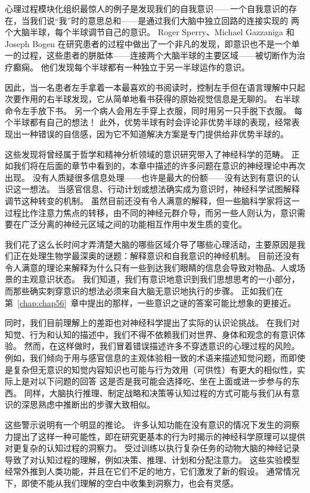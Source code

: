心理过程模块化组织最惊人的例子是发现我们的自我意识——一个自我意识的存在，当我们说“我”时的意思总和——是通过我们大脑中独立回路的连接实现的 两个大脑半球，每个半球调节自己的意识。
Roger Sperry、Michael Gazzaniga 和 Joseph Bogen 在研究患者的过程中做出了一个非凡的发现，即意识也不是一个单一的过程，这些患者的胼胝体——连接两个大脑半球的主要区域——被切断作为治疗癫痫。
他们发现每个半球都有一种独立于另一半球运作的意识。


因此，当一名患者左手拿着一本最喜欢的书阅读时，控制左手但在语言理解中只起次要作用的右半球发现，它从简单地看书获得的原始视觉信息是无聊的。
右半球命令左手放下书。
另一个病人会用左手穿上衣服，同时用另一只手脱下衣服。 每个半球都有自己的想法！
此外，优势半球有时会评论非优势半球的表现，经常表现出一种错误的自信感，因为它不知道解决方案是专门提供给非优势半球的。


这些发现将曾经属于哲学和精神分析领域的意识研究带入了神经科学的范畴。
正如我们将在后面的章节中看到的，本章中描述的许多问题在意识的神经理论中再次出现。
没有人质疑很多信息处理——也许是最大的份额——没有达到有意识的认识这一想法。
当感官信息、行动计划或想法确实成为意识时，神经科学试图解释调节这种转变的机制。
虽然目前还没有令人满意的解释，但一些脑科学家将这一过程比作注意力焦点的转移，由不同的神经元群介导，而另一些人则认为，意识需要在广泛分离的神经元区域之间的功能相互作用中发生质的变化。


我们花了这么长时间才弄清楚大脑的哪些区域介导了哪些心理活动，主要原因是我们正在处理生物学最深奥的谜题：解释意识和自我意识的神经机制。
目前还没有令人满意的理论来解释为什么只有一些到达我们眼睛的信息会导致对物品、人或场景的主观意识状态。 
我们知道，我们有意识地意识到我们思想思考的一小部分，而那些确实刺穿意识的想法必须来自大脑无意识地执行的步骤。
正如我们在第~\ref{chap:chap56}~章中提出的那样，一些意识之谜的答案可能比想象的更接近。


同时，我们目前理解上的差距也对神经科学提出了实际的认识论挑战。
在我们对知觉、行为和认知的描述中，我们不得不依赖我们对世界、身体和观念的有意识体验。
然而，在这样做时，我们冒着错误描述许多不穿透意识的心理过程的风险。
例如，我们倾向于用与感官信息的主观体验相一致的术语来描述知觉问题，而即使是复杂但无意识的知觉内容知识也可能与行为效用（可供性）有更大的相似性，实际上是对以下问题的回答 这是否是我可能会选择吃、坐在上面或进一步参与的东西。
同样，大脑执行推理、制定战略和决策等认知过程的方式可能与我们从有意识的深思熟虑中推断出的步骤大致相似。


这些警示说明有一个明显的推论。
许多认知功能在没有意识的情况下发生的洞察力提出了这样一种可能性，即在研究更基本的行为时揭示的神经科学原理可以提供对更复杂的认知过程的洞察力。
受过训练以执行复杂任务的动物大脑的神经记录导致了对认知过程的理解，例如决策、推理、计划和分配注意力。 
这些实验模型经常外推到人类功能，并且在它们不足的地方，它们激发了新的假设。
通常情况下，即使不能从我们理解的空白中收集到洞察力，也会有灵感。


